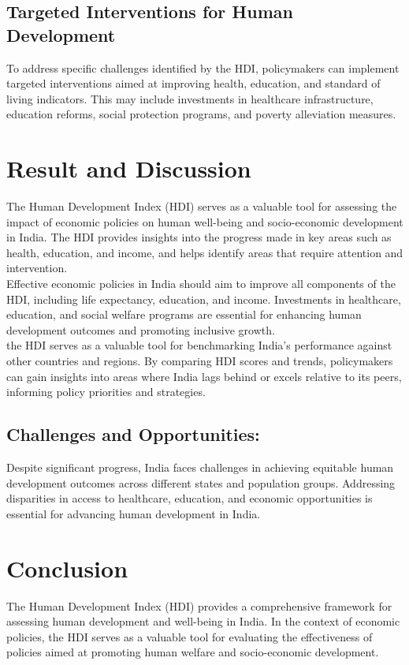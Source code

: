 \documentclass[12pt]{report}
\begin{document}
\subsection*{Targeted Interventions for Human Development}
To address specific challenges identified by the HDI, policymakers can implement targeted interventions aimed at improving health, education, and standard of living indicators. This may include investments in healthcare infrastructure, education reforms, social protection programs, and poverty alleviation measures.\cite{index}



\newpage
\section*{Result and Discussion}
The Human Development Index (HDI)\cite{define} serves as a valuable tool for assessing the impact of economic policies on human well-being and socio-economic development in India. The HDI provides insights into the progress made in key areas such as health, education, and income, and helps identify areas that require attention and intervention.\\

Effective economic policies in India should aim to improve all components of the HDI, including life expectancy, education, and income. Investments in healthcare, education, and social welfare programs are essential for enhancing human development outcomes and promoting inclusive growth.\\

the\cite{index} HDI serves as a valuable tool for benchmarking India's performance against other countries and regions. By comparing HDI scores and trends, policymakers can gain insights into areas where India lags behind or excels relative to its peers, informing policy priorities and strategies.
\subsection*{Challenges and Opportunities:}Despite significant progress, India faces challenges in achieving equitable human development outcomes across different states and population groups. Addressing disparities in access to healthcare, education, and economic opportunities is essential for advancing human development in India.\cite{information}


\newpage
\section*{Conclusion}
The Human Development Index (HDI) provides a comprehensive framework for assessing human development and well-being in India. In the context of economic policies, the HDI serves as a valuable tool for evaluating the effectiveness of policies aimed at promoting human welfare and socio-economic development.
\end{document}
